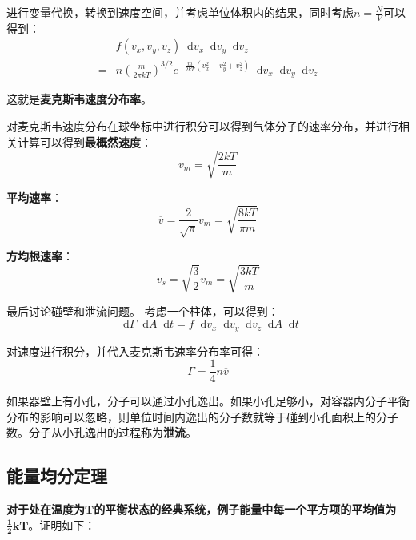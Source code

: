 \documentclass[UTF8]{ctexart}
\newcommand*{\dif}{\mathop{}\!\mathrm{d}}
\begin{document}
	进行变量代换，转换到速度空间，并考虑单位体积内的结果，同时考虑$ n=\frac{N}{V} $可以得到：
	\begin{equation}
		\begin{aligned}
			&f(v_{x},v_{y},v_{z}) \dif v_{x} \dif v_{y} \dif v_{z}\\
		= &n \left(\frac{m}{2 \pi k T}\right)^{3/2} e^{-\frac{m}{2 k T} (v_{x}^{2}+v_{y}^{2}+v_{z}^{2})} \dif v_{x}	\dif v_{y}	\dif v_{z}	
		\end{aligned}
	\end{equation}

\noindent 这就是\textbf{麦克斯韦速度分布率}。

	对麦克斯韦速度分布在球坐标中进行积分可以得到气体分子的速率分布，并进行相关计算可以得到\textbf{最概然速度}：
	\begin{equation}
		v_{m}=\sqrt{\frac{2 k T}{m}}
	\end{equation}
	
\noindent \textbf{平均速率}：
	\begin{equation}
		\overline{v}=\frac{2}{\sqrt{\pi}} v_{m}= \sqrt{\frac{8 k T}{\pi m}}
	\end{equation}
	
\noindent \textbf{方均根速率}：
	\begin{equation}
		v_{s}=\sqrt{\frac{3}{2}}v_{m}=\sqrt{\frac{3 k T}{m}}
	\end{equation}
	
	最后讨论碰壁和泄流问题。
	考虑一个柱体，可以得到：
	\begin{equation}
		\dif \Gamma \dif A \dif t=f \dif v_{x} \dif v_{y} \dif v_{z} \dif A \dif t
	\end{equation}
	
\noindent 对速度进行积分，并代入麦克斯韦速率分布率可得：
	\begin{equation}
		\Gamma=\frac{1}{4} n \overline{v}
	\end{equation}
	
	如果器壁上有小孔，分子可以通过小孔逸出。如果小孔足够小，对容器内分子平衡分布的影响可以忽略，则单位时间内逸出的分子数就等于碰到小孔面积上的分子数。分子从小孔逸出的过程称为\textbf{泄流}。
	
	\subsection{能量均分定理}
	\textbf{对于处在温度为}$\mathbf{T}$\textbf{的平衡状态的经典系统，例子能量中每一个平方项的平均值为}$\mathbf{\frac{1}{2} k T}$。证明如下：
\end{document}
